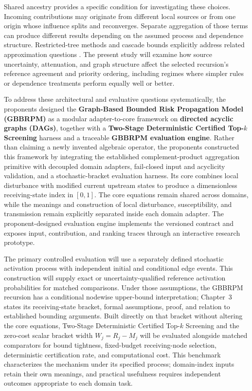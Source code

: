 Shared ancestry provides a specific condition for investigating these
choices. Incoming contributions may originate from different local sources
or from one origin whose influence splits and reconverges. Separate
aggregation of those terms can produce different results depending on the
assumed process and dependence structure. Restricted-tree methods and
cascade bounds explicitly address related approximation questions
\citep{chen2010mia,abbe2017,abbe2020}. The present study will examine how source
uncertainty, attenuation, and graph structure affect the selected recursion's
reference agreement and priority ordering, including regimes where simpler
rules or dependence treatments perform equally well or better.

To address these architectural and evaluative questions systematically, the
proponents designed the \textbf{Graph-Based Bounded Risk Propagation Model
(GBBRPM)} as a modular adapter-to-core framework on \textbf{directed acyclic
graphs (DAGs)}, together with a \textbf{Two-Stage Deterministic Certified
Top-$k$ Screening} harness and a traceable \textbf{GBBRPM evaluation engine}.
Rather than claiming a newly invented algebraic operator, the proponents
constructed this framework by integrating the established complement-product
aggregation primitive \citep{klement2004} with decoupled domain adapters,
fail-closed input and acyclicity validation, and a stochastic-bracket
evaluation harness. Its core combines local disturbance with modified current
upstream states to produce a dimensionless receiving-state index in $[0,1]$.
The core equations remain shared across domains, while the meanings and
construction of local disturbance, susceptibility, and transmission remain
explicitly separated inside each domain adapter. The proponent-designed
evaluation engine implements the versioned contract and exposes input,
contribution, and ranking traces through an interactive research prototype.

The primary controlled evaluation will use a separately defined stochastic
activation process with independent initial and conditional edge events.
This construction will supply exact or uncertainty-qualified reference
activation probabilities for matched comparisons. Under those assumptions,
the GBBRPM recursion has a conditional nodewise upper-bound interpretation;
Chapter~3 states its receiving-state bracket, formal assumptions, proof, and
relation to established bounding arguments. Built directly on that bracket
without altering the core equations, Two-Stage Deterministic Certified
Top-$k$ Screening and the zero-cost scalar bracket width $W_j = R_j - M_j$
will be evaluated alongside matched comparators for bound tightness,
fixed-budget receiving-node selection, deterministic certification rate, and
computational cost. This benchmark characterizes the mechanism under its
specified process; domain-index inputs retain their own meanings, and
practical usefulness requires independent outcomes appropriate to each domain
task.

